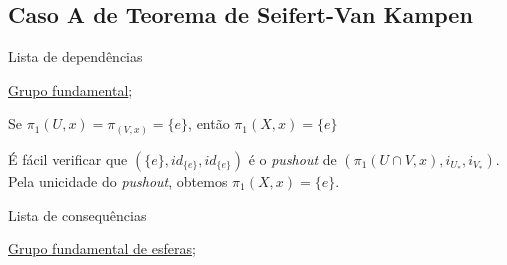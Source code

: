 \subsection{Caso A de Teorema de Seifert-Van Kampen} %
\label{teorema-s-vk-caso-a-prop}
\begin{titlemize}{Lista de dependências}
	\item \hyperref[grupo-fundamental]{Grupo fundamental};\\
\end{titlemize}
\begin{prop}
    Se $\pi_1(U,x)=\pi_(V,x)=\{e\}$, então $\pi_1(X,x)=\{e\}$
\end{prop}
\begin{dem}
    É fácil verificar que $(\{e\},id_{\{e\}},id_{\{e\}})$ é o \emph{pushout} de $(\pi_1(U\cap V,x),i_{U_*},i_{V_*})$. Pela unicidade do \emph{pushout}, obtemos $\pi_1(X,x)=\{e\}$.
\end{dem}
\begin{titlemize}{Lista de consequências}
	\item \hyperref[grupo-fundamental-de-esferas-prop]{Grupo fundamental de esferas};\\ %
\end{titlemize}